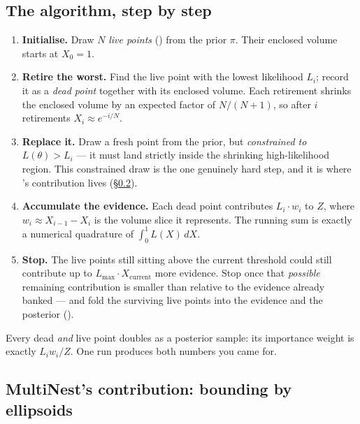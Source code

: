 \subsection{The algorithm, step by step}
\label{sec:nested-algorithm}

\begin{enumerate}
  \item \textbf{Initialise.} Draw $N$ \emph{live points} () from the
        prior $\pi$. Their enclosed volume starts at $X_0 = 1$.
  \item \textbf{Retire the worst.} Find the live point with the lowest likelihood
        $L_i$; record it as a \emph{dead point} together with its enclosed volume.
        Each retirement shrinks the enclosed volume by an expected factor of
        $N/(N+1)$, so after $i$ retirements $X_i \approx e^{-i/N}$.
  \item \textbf{Replace it.} Draw a fresh point from the prior, but
        \emph{constrained to $L(\theta) > L_i$} --- it must land strictly inside the
        shrinking high-likelihood region. This constrained draw is the one genuinely
        hard step, and it is where 's contribution lives
        (\S\ref{sec:multinest-ellipsoids}).
  \item \textbf{Accumulate the evidence.} Each dead point contributes
        $L_i \cdot w_i$ to $Z$, where $w_i \approx X_{i-1} - X_i$ is the volume slice
        it represents. The running sum is exactly a numerical quadrature of
        $\int_0^1 L(X)\,dX$.
  \item \textbf{Stop.} The live points still sitting above the current threshold could
        still contribute up to $L_{\max}\cdot X_{\text{current}}$ more evidence. Stop
        once that \emph{possible} remaining contribution is smaller than
         relative to the evidence already banked --- and fold the
        surviving live points into the evidence and the posterior
        ().
\end{enumerate}

Every dead \emph{and} live point doubles as a posterior sample: its importance weight
is exactly $L_i w_i / Z$. One run produces both numbers you came for.

\subsection{MultiNest's contribution: bounding by ellipsoids}
\label{sec:multinest-ellipsoids}

